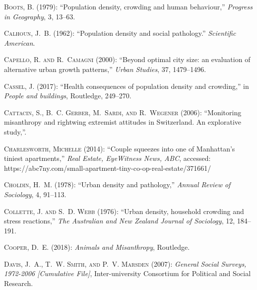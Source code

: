 \documentclass[11pt, letterpaper]{article}
\begin{document}
\begin{spacing}{1.4}
\begin{thebibliography}{92}
\textsc{Boots, B.} (1979): \enquote{Population density, crowding and human
  behaviour,} \emph{Progress in Geography}, 3, 13--63.

\textsc{Calhoun, J.~B.} (1962): \enquote{Population density and social
  pathology.} \emph{Scientific American}.

\textsc{Capello, R. and R.~Camagni} (2000): \enquote{Beyond optimal city size:
  an evaluation of alternative urban growth patterns,} \emph{Urban Studies},
  37, 1479--1496.

\textsc{Cassel, J.} (2017): \enquote{Health consequences of population density
  and crowding,} in \emph{People and buildings}, Routledge, 249--270.

\textsc{Cattacin, S., B.~C. Gerber, M.~Sardi, and R.~Wegener} (2006):
  \enquote{Monitoring misanthropy and rightwing extremist attitudes in
  Switzerland. An explorative study,}.
  
\textsc{Charlesworth, Michelle} (2014): \enquote{Couple squeezes into one of Manhattan's tiniest apartments,}
  \emph{Real Estate, EyeWitness News, ABC}, accessed:
 https://abc7ny.com/small-apartment-tiny-co-op-real-estate/371661/  

\textsc{Choldin, H.~M.} (1978): \enquote{Urban density and pathology,}
  \emph{Annual Review of Sociology}, 4, 91--113.

\textsc{Collette, J. and S.~D. Webb} (1976): \enquote{Urban density, household
  crowding and stress reactions,} \emph{The Australian and New Zealand Journal
  of Sociology}, 12, 184--191.

\textsc{Cooper, D.~E.} (2018): \emph{Animals and Misanthropy}, Routledge.

\textsc{Davis, J.~A., T.~W. Smith, and P.~V. Marsden} (2007): \emph{General
  Social Surveys, 1972-2006 [Cumulative File]}, Inter-university Consortium for
  Political and Social Research.


\end{thebibliography}
\end{spacing}
\end{document}
